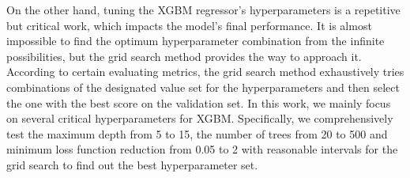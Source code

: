 \documentclass[11pt]{article}
\begin{document}
    On the other hand, tuning the XGBM regressor's hyperparameters is a repetitive but critical work, which impacts the model’s final performance. It is almost impossible to find the optimum hyperparameter combination from the infinite possibilities, but the grid search method provides the way to approach it. According to certain evaluating metrics, the grid search method exhaustively tries combinations of the designated value set for the hyperparameters and then select the one with the best score on the validation set. In this work, we mainly focus on several critical hyperparameters for XGBM. Specifically, we comprehensively test the maximum depth from 5 to 15, the number of trees from 20 to 500 and minimum loss function reduction from 0.05 to 2 with reasonable intervals for the grid search to find out the best hyperparameter set.
    
    
    
\end{document}
